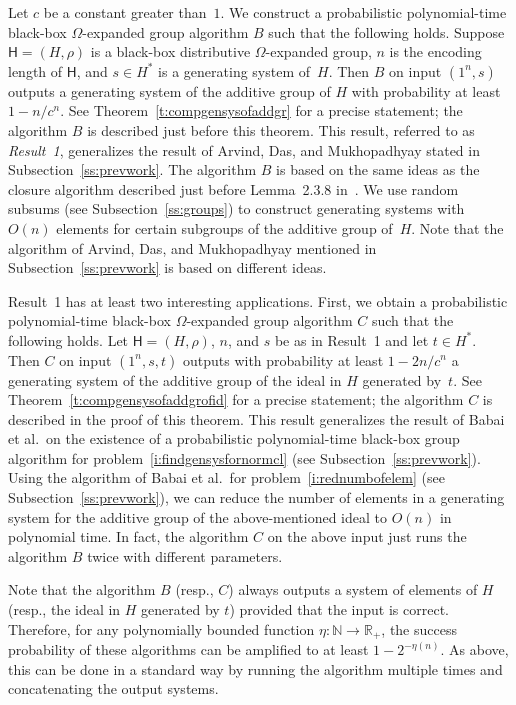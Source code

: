 \documentclass{jgcc}
\newcommand{\bb}{\mathsf}
\newcommand{\N}{\mathbb N}
\newcommand{\R}{\mathbb R}
\begin{document}
Let $c$ be a constant greater than~$1$. We construct a
probabilistic polynomial-time black-box $\Omega$-expanded
group algorithm $B$ such that the following holds. Suppose
$\bb H=(H,\rho)$ is a black-box distributive
$\Omega$-expanded group, $n$ is the encoding length of $\bb
H$, and $s\in H^*$ is a generating system of~$H$. Then $B$
on input $(1^n,s)$ outputs a generating system of the
additive group of $H$ with probability at least $1-n/c^n$.
See Theorem~\ref{t:compgensysofaddgr} for a precise
statement; the algorithm $B$ is described just before this
theorem. This result, referred to as \emph{Result~1},
generalizes the result of Arvind, Das, and Mukhopadhyay
stated in Subsection~\ref{ss:prevwork}. The algorithm $B$ is
based on the same ideas as the closure algorithm described
just before Lemma~2.3.8 in~\cite{Ser03}. We use random
subsums (see Subsection~\ref{ss:groups}) to construct
generating systems with $O(n)$ elements for certain
subgroups of the additive group of~$H$. Note that the
algorithm of Arvind, Das, and Mukhopadhyay mentioned in
Subsection~\ref{ss:prevwork} is based on different ideas.

Result~1 has at least two interesting applications. First,
we obtain a probabilistic polynomial-time black-box
$\Omega$-expanded group algorithm $C$ such that the
following holds. Let $\bb H=(H,\rho)$, $n$, and $s$ be as in
Result~1 and let $t\in H^*$. Then $C$ on input $(1^n,s,t)$
outputs with probability at least $1-2n/c^n$ a generating
system of the additive group of the ideal in $H$ generated
by~$t$. See Theorem~\ref{t:compgensysofaddgrofid} for a
precise statement; the algorithm $C$ is described in the
proof of this theorem. This result generalizes the result of
Babai et al.\ on the existence of a probabilistic
polynomial-time black-box group algorithm for
problem~\ref{i:findgensysfornormcl} (see
Subsection~\ref{ss:prevwork}). Using the algorithm of Babai
et al.\ for problem~\ref{i:rednumbofelem} (see
Subsection~\ref{ss:prevwork}), we can reduce the number of
elements in a generating system for the additive group of
the above-mentioned ideal to $O(n)$ in polynomial time. In
fact, the algorithm $C$ on the above input just runs the
algorithm $B$ twice with different parameters.

Note that the algorithm $B$ (resp., $C$) always outputs a
system of elements of $H$ (resp., the ideal in $H$ generated
by $t$) provided that the input is correct. Therefore, for
any polynomially bounded function $\eta\colon\N\to\R_+$, the
success probability of these algorithms can be amplified to
at least $1-2^{-\eta(n)}$. As above, this can be done in a
standard way by running the algorithm multiple times and
concatenating the output systems.
\end{document}
